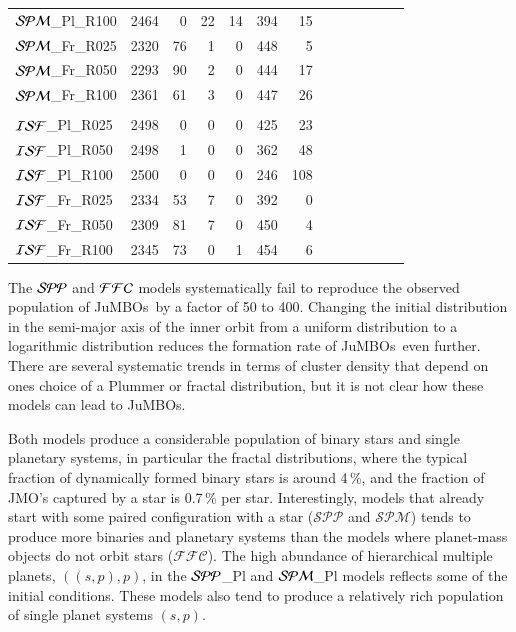 \documentclass[submission,phys]{lib/SciPost}
\newcommand{\jumbos}{\mbox{JuMBOs}}
\begin{document}
\begin{table}
\begin{tabular}{lrrrrrrrrrrrr}
${\cal SPM}$\_Pl\_R100 &  2464 &  0 & 22 & 14 & 394 & 15 \\
${\cal SPM}$\_Fr\_R025 &  2320 & 76 &  1 &  0 & 448 &  5 \\ 
${\cal SPM}$\_Fr\_R050 &  2293 & 90 &  2 &  0 & 444 & 17 \\
${\cal SPM}$\_Fr\_R100 &  2361 & 61 &  3 &  0 & 447 & 26 \\
  \hline
  \hline \vspace{-0.75em}\\
${\cal ISF}$\_Pl\_R025 &  2498 & 0 & 0 & 0 & 425 & 23 \\
${\cal ISF}$\_Pl\_R050 &  2498 & 1 & 0 & 0 & 362 & 48 \\
${\cal ISF}$\_Pl\_R100 &  2500 & 0 & 0 & 0 & 246 & 108 \\
${\cal ISF}$\_Fr\_R025 &  2334 & 53 & 7 & 0 & 392 & 0 \\
${\cal ISF}$\_Fr\_R050 &  2309 & 81 & 7 & 0 & 450 & 4 \\
${\cal ISF}$\_Fr\_R100 &  2345 & 73 & 0 & 1 & 454 & 6 \\
  \hline
 \end{tabular}
\end{table}

The ${\cal SPP}$ and ${\cal FFC}$ models systematically fail to
reproduce the observed population of \jumbos\, by a factor of 50 to
400. Changing the initial distribution in the semi-major axis of the inner
orbit from a uniform distribution to a logarithmic distribution
reduces the formation rate of \jumbos\, even further.  There are
several systematic trends in terms of cluster density that depend on 
ones choice of a Plummer or fractal distribution, but it is not clear 
how these models can lead to \jumbos. 

Both models produce a considerable population of
binary stars and single planetary systems, in particular the
fractal distributions, where the typical fraction of dynamically
formed binary stars is around 4\,\%, and the fraction of JMO's
captured by a star is 0.7\,\% per star.  Interestingly, models that
already start with some paired configuration with a star ($\mathcal{SPP}$ 
and $\mathcal{SPM}$) tends to produce more binaries and planetary systems 
than the models where planet-mass objects do not orbit stars ($\mathcal{FFC}$).
The high abundance of hierarchical multiple planets, $((s,p),p)$, in the 
${\cal SPP}$\_Pl and ${\cal SPM}$\_Pl models reflects some of the initial
conditions. These models also tend to produce a relatively rich
population of single planet systems $(s,p)$.
\end{document}
